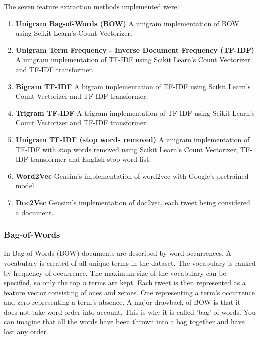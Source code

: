The seven feature extraction methods implemented were:
\begin{enumerate}
    \item \textbf{Unigram Bag-of-Words (BOW)}\newline
    A unigram implementation of BOW using Scikit Learn's Count Vectorizer.
    \item \textbf{Unigram Term Frequency - Inverse Document Frequency (TF-IDF)}\newline
    A unigram implementation of TF-IDF using Scikit Learn's Count Vectorizer and TF-IDF transformer.
    \item \textbf{Bigram TF-IDF}\newline
    A bigram implementation of TF-IDF using Scikit Learn's Count Vectorizer and TF-IDF transformer.
    \item \textbf{Trigram TF-IDF} \newline
    A trigram implementation of TF-IDF using Scikit Learn's Count Vectorizer and TF-IDF transformer.
    \item \textbf{Unigram TF-IDF (stop words removed)}\newline
    A unigram implementation of TF-IDF with stop words removed using Scikit Learn's Count Vectorizer, TF-IDF transformer and English stop word list.
    \item \textbf{Word2Vec}\newline
    Gensim's implementation of word2vec with Google's pretrained model.    
    \item \textbf{Doc2Vec}\newline
    Gensim's implementation of doc2vec, each tweet being considered a document.
\end{enumerate}

\subsubsection{Bag-of-Words}

In Bag-of-Words (BOW) documents are described by word occurrences. A vocabulary is created of all unique terms in the dataset. The vocabulary is ranked by frequency of occurrence. The maximum size of the vocabulary can be specified, so only the top \textit{n} terms are kept. Each tweet is then represented as a feature vector consisting of ones and zeroes. One representing a term's occurrence and zero representing a term's absence. A major drawback of BOW is that it does not take word order into account. This is why it is called 'bag' of words. You can imagine that all the words have been thrown into a bag together and have lost any order.

